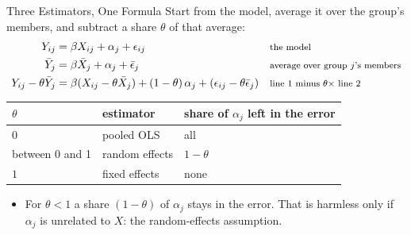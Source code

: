 \documentclass[aspectratio=169,11pt,xcolor=dvipsnames]{beamer}
\begin{document}
\begin{frame}{Three Estimators, One Formula}
Start from the model, average it over the group's members, and subtract a share $\theta$
of that average:
\begin{align*}
  Y_{ij} &= \beta X_{ij} + \alpha_j + \epsilon_{ij}
   && \text{\footnotesize the model} \\
  \bar Y_j &= \beta \bar X_j + \alpha_j + \bar\epsilon_j
   && \text{\footnotesize average over group $j$'s members} \\
  Y_{ij} - \theta\bar Y_j
  &= \beta(X_{ij} - \theta\bar X_j) + (1-\theta)\,\alpha_j + (\epsilon_{ij} - \theta\bar\epsilon_j)
   && \text{\footnotesize line 1 minus $\theta \times$ line 2}
\end{align*}
\begin{center}\small
\renewcommand{\arraystretch}{1.15}
\begin{tabular}{@{}lll@{}}
\toprule
$\theta$ & estimator & share of $\alpha_j$ left in the error \\
\midrule
$0$ & pooled OLS & all \\
between 0 and 1 & random effects & $1 - \theta$ \\
$1$ & fixed effects & none \\
\bottomrule
\end{tabular}
\end{center}
\begin{itemize}\itemsep2pt
  \item For $\theta < 1$ a share $(1-\theta)$ of $\alpha_j$ stays in the error. That is
        harmless only if $\alpha_j$ is unrelated to $X$: the random-effects assumption.
\end{itemize}
\end{frame}
\end{document}
